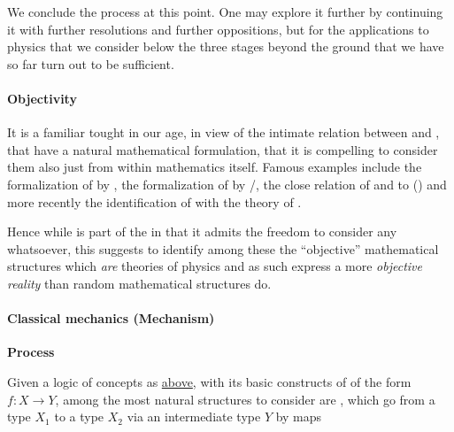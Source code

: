 \documentclass[12pt,titlepage]{article}
\theoremstyle{plain}
\theoremstyle{definition}
\theoremstyle{remark}
\begin{document}
$\,$

We conclude the process at this point. One may explore it further by continuing it with further resolutions and further oppositions, but for the applications to physics that we consider below the three stages beyond the ground that we have so far turn out to be sufficient.

\hypertarget{objectivity}{}\paragraph*{{Objectivity}}\label{objectivity}

It is a familiar tought in our age, in view of the intimate relation between  and , that  have a natural mathematical formulation, that it is compelling to consider them also just from within mathematics itself. Famous examples include the formalization of  by , the formalization of  by /, the close relation of  and  to  () and more recently the identification of  with the theory of .

Hence while  is part of the  in that it admits the freedom to consider any  whatsoever, this suggests to identify among these the ``objective'' mathematical structures which \emph{are} theories of physics and as such express a more \emph{objective reality} than random mathematical structures do.

\hypertarget{classical_mechanics_mechanism}{}\paragraph*{{Classical mechanics (Mechanism)}}\label{classical_mechanics_mechanism}

\textbf{Process}

Given a logic of concepts as \hyperlink{ConceptFormalization}{above}, with its basic constructs of  of the form $f \colon X \to Y$, among the most natural structures to consider are , which go from a type $X_1$ to a type $X_2$ via an intermediate type $Y$ by maps
\end{document}
